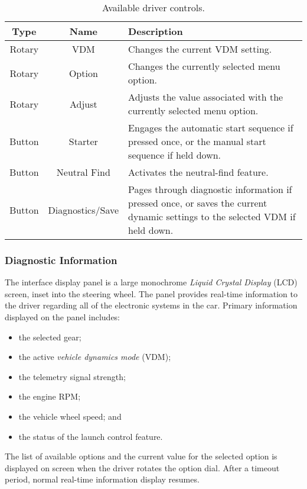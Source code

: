 \begin{table}[H]
\caption{Available driver controls.\label{table:driver_controls}}
\centering
\begin{tabular}{|c|c|p{8 cm}|}
	\hline 
	Type & Name & Description \\
	\hline
	\hline 
	Rotary & VDM & Changes the current VDM setting. \\
	\hline 
	Rotary & Option & Changes the currently selected menu option. \\
	\hline
	Rotary & Adjust & Adjusts the value associated with the currently selected menu option. \\
	\hline
	Button & Starter & Engages the automatic start sequence if pressed once, or the manual start sequence if held down.\\
	\hline
	Button & Neutral Find & Activates the neutral-find feature. \\
	\hline
	Button & Diagnostics/Save & Pages through diagnostic information if pressed once, or saves the current dynamic settings to the selected VDM if held down.\\		
	\hline 		
\end{tabular}
\end{table}


\subsubsection{Diagnostic Information}

The interface display panel is a large monochrome \emph{Liquid Crystal Display} (LCD) screen, inset into the steering wheel. The panel provides real-time information to the driver regarding all of the electronic systems in the car. Primary information displayed on the panel includes:

\begin{itemize}
\item the selected gear;
\item the active \emph{vehicle dynamics mode} (VDM);
\item the telemetry signal strength;
\item the engine RPM;
\item the vehicle wheel speed; and
\item the status of the launch control feature.
\end{itemize}

The list of available options and the current value for the selected option is displayed on screen when the driver rotates the option dial. After a timeout period, normal real-time information display resumes. 



